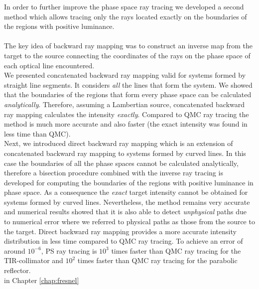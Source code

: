 In order to further improve the phase space ray tracing we developed a second method which allows tracing only the rays located exactly on the boundaries of the regions with positive luminance. 
\\ \\ \indent The key idea of backward ray mapping was to construct an inverse map from the target to the source connecting the coordinates of the rays on the phase space of each optical line encountered. \\ \indent 
We presented concatenated backward ray mapping valid for systems formed by straight line segments. It considers \textit{all} the lines that form the system. We showed that the boundaries of the regions that form every phase space can be calculated \textit{analytically}. Therefore, assuming a Lambertian source, concatenated backward ray mapping calculates the intensity \textit{exactly}. Compared to QMC ray tracing the method is much more accurate and also faster (the exact intensity was found in less time than QMC). \\\indent %
Next, we introduced direct backward ray mapping which is an extension of concatenated backward ray mapping to systems formed by curved lines. In this case the boundaries of all the phase spaces cannot be calculated analytically, therefore a bisection procedure combined with the inverse ray tracing is developed for computing the boundaries of the regions with positive luminance in phase space. As a consequence the \textit{exact} target intensity cannot be obtained for systems formed by curved lines. Nevertheless, the method remains very accurate and numerical results showed that it is also able to detect \textit{unphysical} paths due to numerical error where we referred to physical paths as those from the source to the target. Direct backward ray mapping provides a more accurate intensity distribution in less time compared to QMC ray tracing. To achieve an error of around $10^{-6}$, PS ray tracing is $10^3$ times faster than QMC ray tracing for the TIR-collimator and $10^2$ times faster than QMC ray tracing for the parabolic reflector.\\ \indent in Chapter \ref{chap:fresnel}
